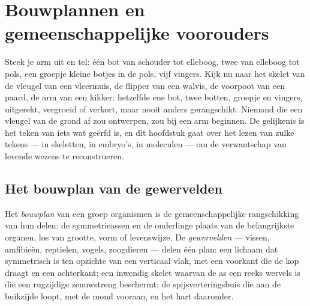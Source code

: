 \chapter{Bouwplannen en gemeenschappelijke voorouders}\label{ch:g10:common-ancestry}

Steek je arm uit en tel: één bot van schouder tot elleboog, twee van
elleboog tot pols, een groepje kleine botjes in de pols, vijf vingers.
Kijk nu naar het skelet van de vleugel van een vleermuis, de flipper van
een walvis, de voorpoot van een paard, de arm van een kikker: hetzelfde
ene bot, twee botten, groepje en vingers, uitgerekt, vergroeid of
verkort, maar nooit anders gerangschikt. Niemand die een vleugel van de
grond af zou ontwerpen, zou bij een arm beginnen. De gelijkenis is het
teken van iets wat geërfd is, en dit hoofdstuk gaat over het lezen van
zulke tekens --- in skeletten, in embryo's, in moleculen --- om de
verwantschap van levende wezens te reconstrueren.

\section{Het bouwplan van de gewervelden}

\begin{definition}[Bouwplan]\label{def:g10:common-ancestry:bodyplan}
Het \emph{bouwplan} van een groep organismen is de
gemeenschappelijke rangschikking van hun delen: de symmetrieassen en de
onderlinge plaats van de belangrijkste organen, los van grootte, vorm of
levenswijze. De \emph{gewervelden} --- vissen,
amfibieën, reptielen, vogels, zoogdieren --- delen één plan: een lichaam
dat symmetrisch is ten opzichte van een verticaal vlak, met een voorkant
die de kop draagt en een achterkant; een inwendig skelet waarvan de as
een reeks wervels is die een rugzijdige zenuwstreng beschermt; de
spijsverteringsbuis die aan de buikzijde loopt, met de mond vooraan, en
het hart daaronder.
\end{definition}


